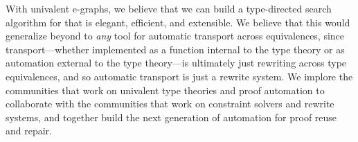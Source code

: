 With univalent e-graphs, we believe that we can build a type-directed search algorithm for 
\toolname that is elegant, efficient, and extensible.
We believe that this would generalize beyond \toolname to \textit{any} tool
for automatic transport across equivalences, since transport---whether implemented as a function internal to the
type theory or as automation external to the type theory---is ultimately just rewriting across type equivalences,
and so automatic transport is just a rewrite system.
We implore the communities that work on univalent type theories and proof automation to collaborate with
the communities that work on constraint solvers and rewrite systems, and together build
the next generation of automation for proof reuse and repair.


